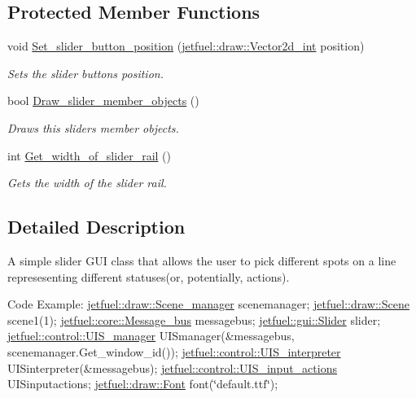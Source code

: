 \subsection*{Protected Member Functions}
\begin{DoxyCompactItemize}
\item 
void \hyperlink{classjetfuel_1_1gui_1_1Slider_ae0b83862beb7f631145fd3c9dddfb661}{Set\+\_\+slider\+\_\+button\+\_\+position} (\hyperlink{classjetfuel_1_1draw_1_1Vector2d}{jetfuel\+::draw\+::\+Vector2d\+\_\+int} position)
\begin{DoxyCompactList}\small\item\em Sets the slider button\textquotesingle{}s position. \end{DoxyCompactList}\item 
bool \hyperlink{classjetfuel_1_1gui_1_1Slider_a730d18fe513120406907380b7caf3280}{Draw\+\_\+slider\+\_\+member\+\_\+objects} ()
\begin{DoxyCompactList}\small\item\em Draws this slider\textquotesingle{}s member objects. \end{DoxyCompactList}\item 
int \hyperlink{classjetfuel_1_1gui_1_1Slider_a4115f54db7955a6493661ec176b532fd}{Get\+\_\+width\+\_\+of\+\_\+slider\+\_\+rail} ()
\begin{DoxyCompactList}\small\item\em Gets the width of the slider rail. \end{DoxyCompactList}\end{DoxyCompactItemize}


\subsection{Detailed Description}
A simple slider G\+UI class that allows the user to pick different spots on a line represesenting different statuses(or, potentially, actions).

Code Example\+: \hyperlink{classjetfuel_1_1draw_1_1Scene__manager}{jetfuel\+::draw\+::\+Scene\+\_\+manager} scenemanager; \hyperlink{classjetfuel_1_1draw_1_1Scene}{jetfuel\+::draw\+::\+Scene} scene1(1); \hyperlink{classjetfuel_1_1core_1_1Message__bus}{jetfuel\+::core\+::\+Message\+\_\+bus} messagebus; \hyperlink{classjetfuel_1_1gui_1_1Slider}{jetfuel\+::gui\+::\+Slider} slider; \hyperlink{classjetfuel_1_1control_1_1UIS__manager}{jetfuel\+::control\+::\+U\+I\+S\+\_\+manager} U\+I\+Smanager(\&messagebus, scenemanager.\+Get\+\_\+window\+\_\+id()); \hyperlink{classjetfuel_1_1control_1_1UIS__interpreter}{jetfuel\+::control\+::\+U\+I\+S\+\_\+interpreter} U\+I\+Sinterpreter(\&messagebus); \hyperlink{structjetfuel_1_1control_1_1UIS__input__actions}{jetfuel\+::control\+::\+U\+I\+S\+\_\+input\+\_\+actions} U\+I\+Sinputactions; \hyperlink{classjetfuel_1_1draw_1_1Font}{jetfuel\+::draw\+::\+Font} font(\char`\"{}default.\+ttf\char`\"{});

